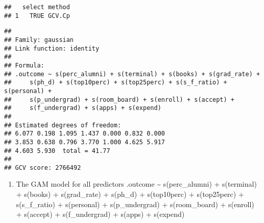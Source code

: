 \documentclass[
]{article}
\newenvironment{Shaded}{\begin{snugshade}}{\end{snugshade}}
\newcommand{\AttributeTok}[1]{\textcolor[rgb]{0.77,0.63,0.00}{#1}}
\newcommand{\CommentTok}[1]{\textcolor[rgb]{0.56,0.35,0.01}{\textit{#1}}}
\newcommand{\ConstantTok}[1]{\textcolor[rgb]{0.00,0.00,0.00}{#1}}
\newcommand{\FunctionTok}[1]{\textcolor[rgb]{0.00,0.00,0.00}{#1}}
\newcommand{\NormalTok}[1]{#1}
\newcommand{\OtherTok}[1]{\textcolor[rgb]{0.56,0.35,0.01}{#1}}
\newcommand{\SpecialCharTok}[1]{\textcolor[rgb]{0.00,0.00,0.00}{#1}}
\newcommand{\StringTok}[1]{\textcolor[rgb]{0.31,0.60,0.02}{#1}}
\providecommand{\tightlist}{%
  \setlength{\itemsep}{0pt}\setlength{\parskip}{0pt}}
\begin{document}
\begin{Shaded}
\end{Shaded}

\begin{verbatim}
##   select method
## 1   TRUE GCV.Cp
\end{verbatim}

\begin{Shaded}
\end{Shaded}

\begin{verbatim}
## 
## Family: gaussian 
## Link function: identity 
## 
## Formula:
## .outcome ~ s(perc_alumni) + s(terminal) + s(books) + s(grad_rate) + 
##     s(ph_d) + s(top10perc) + s(top25perc) + s(s_f_ratio) + s(personal) + 
##     s(p_undergrad) + s(room_board) + s(enroll) + s(accept) + 
##     s(f_undergrad) + s(apps) + s(expend)
## 
## Estimated degrees of freedom:
## 6.077 0.198 1.095 1.437 0.000 0.832 0.000 
## 3.853 0.638 0.796 3.770 1.000 4.625 5.917 
## 4.603 5.930  total = 41.77 
## 
## GCV score: 2766492
\end{verbatim}

\begin{enumerate}
\def\labelenumi{\arabic{enumi}.}
\tightlist
\item
  The GAM model for all predictors .outcome \textasciitilde{}
  s(perc\_alumni) + s(terminal) + s(books) + s(grad\_rate) + s(ph\_d) +
  s(top10perc) + s(top25perc) + s(s\_f\_ratio) + s(personal) +
  s(p\_undergrad) + s(room\_board) + s(enroll) + s(accept) +
  s(f\_undergrad) + s(apps) + s(expend)
\end{enumerate}
\end{document}
